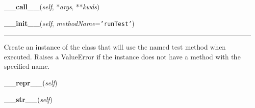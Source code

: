     \label{unittest:TestCase:__call__}

    \vspace{0.5ex}

    \begin{boxedminipage}{\textwidth}

    \raggedright \textbf{\_\_call\_\_}(\textit{self}, *\textit{args}, **\textit{kwds})

    \end{boxedminipage}

    \label{unittest:TestCase:__init__}

    \vspace{0.5ex}

    \begin{boxedminipage}{\textwidth}

    \raggedright \textbf{\_\_init\_\_}(\textit{self}, \textit{methodName}=\texttt{'runTest'})

    \vspace{-1.5ex}

    \rule{\textwidth}{0.5\fboxrule}
    Create an instance of the class that will use the named test method 
    when executed. Raises a ValueError if the instance does not have a 
    method with the specified name.

    \vspace{1ex}

    \end{boxedminipage}

    \label{unittest:TestCase:__repr__}

    \vspace{0.5ex}

    \begin{boxedminipage}{\textwidth}

    \raggedright \textbf{\_\_repr\_\_}(\textit{self})

    \end{boxedminipage}

    \label{unittest:TestCase:__str__}

    \vspace{0.5ex}

    \begin{boxedminipage}{\textwidth}

    \raggedright \textbf{\_\_str\_\_}(\textit{self})

    \end{boxedminipage}

